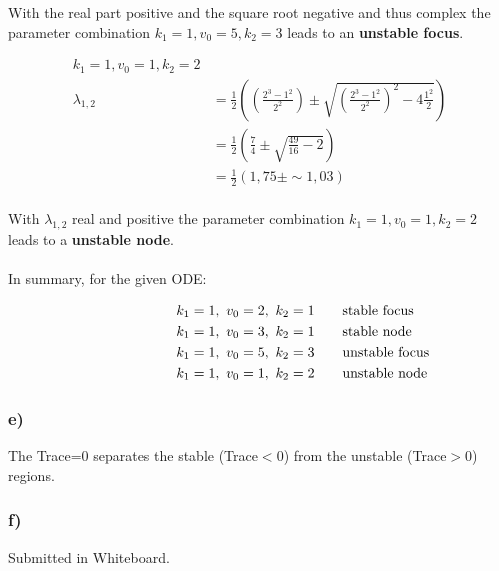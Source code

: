 \documentclass[]{scrartcl}
\begin{document}
With the real part positive and the square root negative and thus complex the parameter combination $k_1 = 1, v_0 = 5, k_2 = 3$ leads to an \textbf{unstable focus}.

\begin{center}
\begin{align*}
	k_1 = 1, v_0 = 1, k_2 = 2 & \\
	\lambda_{1,2}	& =  \frac{1}{2} \left( \left( \frac{2^3 - 1^2}{2^2} \right) \pm \sqrt{ \left( \frac{2^3 - 1^2}{2^2}  \right)^2 - 4 \frac{1^2}{2} } \right) \\
					& =  \frac{1}{2} \left( \frac{7}{4} \pm \sqrt{ \frac{49}{16} - 2 } \right) \\
					& =  \frac{1}{2} \left( 1,75 \pm \sim 1,03 \right) \\
\end{align*}
\end{center}

With $\lambda_{1,2}$ real and positive the parameter combination $k_1 = 1, v_0 = 1, k_2 = 2$ leads to a \textbf{unstable node}.
\\
\\
In summary, for the given ODE:

\begin{center}
\begin{align*}
	k_1 = 1, ~ v_0 = 2, ~ k_2 = 1 & \hspace{1em} & \rlap{stable focus} \\
	k_1 = 1, ~ v_0 = 3, ~ k_2 = 1 & \hspace{1em} & \rlap{stable node} \\
	k_1 = 1, ~ v_0 = 5, ~ k_2 = 3 & \hspace{1em} & \rlap{unstable focus} \\
	k_1 = 1, ~ v_0 = 1, ~ k_2 = 2 & \hspace{1em} & \rlap{unstable node} \\
\end{align*}
\end{center}


\subsubsection*{e)}


The Trace=0 separates the stable (Trace$<0$) from the unstable (Trace$>0$) regions.


\subsubsection*{f)}

Submitted in Whiteboard.
\end{document}
